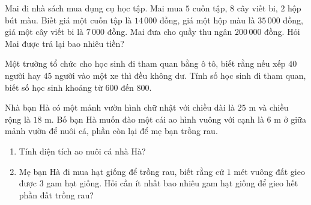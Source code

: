 \begin{bt} Mai đi nhà sách mua dụng cụ học tập. Mai mua $5$ cuốn tập, $8$ cây viết bi, $2$ hộp bút màu. Biết giá một cuốn tập là $14\,000$ đồng, giá một hộp màu là $35\,000$ đồng, giá một cây viết bi là $7\,000$ đồng. Mai đưa cho quầy thu ngân $200\,000$  đồng. Hỏi Mai được trả lại bao nhiêu tiền?
	
\end{bt}


\begin{bt}
	Một trường tổ chức cho học sinh đi tham quan bằng ô tô, biết rằng nếu xếp $40$ người hay $45$ người vào một xe thì đều không dư. Tính số học sinh đi tham quan, biết số học sinh khoảng từ $600$ đến $800$.
\end{bt}


\begin{bt}Nhà bạn Hà có một mảnh vườn hình chữ nhật với chiều dài là $25$ m và chiều rộng là $18$ m. Bố bạn Hà muốn đào một cái ao hình vuông với cạnh là $6$ m ở giữa mảnh vườn để nuôi cá, phần còn lại để mẹ bạn trồng rau.
	\begin{enumerate}
		\item  Tính diện tích ao nuôi cá nhà Hà?
		\item Mẹ bạn Hà đi mua hạt giống để trồng rau, biết rằng cứ $1$ mét vuông đất gieo được $3$ gam hạt giống. Hỏi cần ít nhất bao nhiêu gam hạt giống để gieo hết phần đất trồng rau? 
	\end{enumerate}
	
\end{bt}


